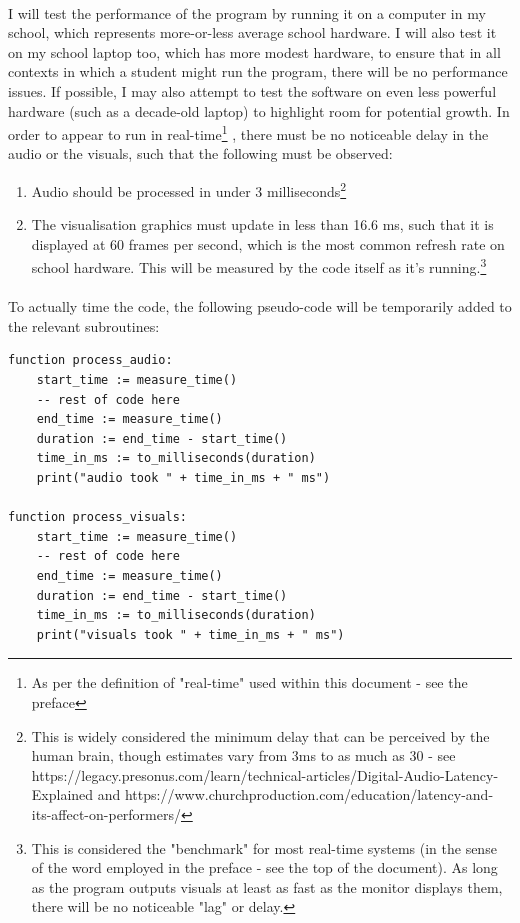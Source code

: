\paragraph{}
I will test the performance of the program by running it on a computer in my school, which represents more-or-less average school hardware.
I will also test it on my school laptop too, which has more modest hardware, to ensure that in all contexts in which a student might run the program, there will be no performance issues. If possible, I may also attempt to test the software on even less powerful hardware (such as a decade-old laptop) to highlight room for potential growth.
In order to appear to run in real-time\footnote{
As per the definition of "real-time" used within this document - see the preface}
, there must be no noticeable delay in the audio or the visuals, such that the following must be observed:
\begin{enumerate}
	\item Audio should be processed in under 3 milliseconds\footnote{
		This is widely considered the minimum delay that can be perceived by the human brain, though estimates vary from 3ms to as much as 30 -  see https://legacy.presonus.com/learn/technical-articles/Digital-Audio-Latency-Explained and https://www.churchproduction.com/education/latency-and-its-affect-on-performers/
	}
	\item The visualisation graphics must update in less than 16.6 ms, such that it is displayed at 60 frames per second, which is the most common refresh rate on school hardware. This will be measured by the code itself as it's running.\footnote{
		This is considered the "benchmark" for most real-time systems (in the sense of the word employed in the preface - see the top of the document). As long as the program outputs visuals at least as fast as the monitor displays them,  there will be no noticeable "lag" or delay.
	}
\end{enumerate}

\paragraph{}
To actually time the code, the following pseudo-code will be temporarily added to the relevant subroutines:
\begin{verbatim}
function process_audio:
	start_time := measure_time()
	-- rest of code here
	end_time := measure_time()
	duration := end_time - start_time()
	time_in_ms := to_milliseconds(duration)
	print("audio took " + time_in_ms + " ms")
	
function process_visuals:
	start_time := measure_time()
	-- rest of code here
	end_time := measure_time()
	duration := end_time - start_time()
	time_in_ms := to_milliseconds(duration)
	print("visuals took " + time_in_ms + " ms")
\end{verbatim}


